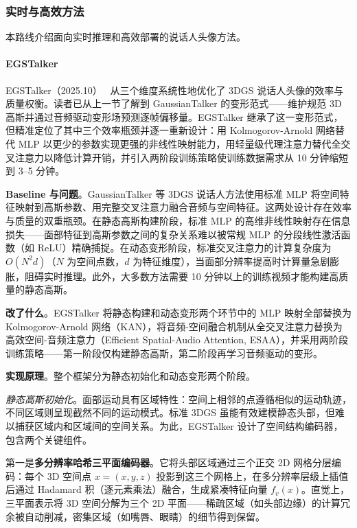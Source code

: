 \subsubsection{实时与高效方法}

本路线介绍面向实时推理和高效部署的说话人头像方法。

\paragraph{EGSTalker}

EGSTalker（2025.10）~\cite{2510_08587} 从三个维度系统性地优化了 3DGS 说话人头像的效率与质量权衡。读者已从上一节了解到 GaussianTalker 的变形范式——维护规范 3D 高斯并通过音频驱动变形场预测逐帧偏移量。EGSTalker 继承了这一变形范式，但精准定位了其中三个效率瓶颈并逐一重新设计：用 Kolmogorov-Arnold 网络替代 MLP 以更少的参数实现更强的非线性映射能力，用轻量级代理注意力替代全交叉注意力以降低计算开销，并引入两阶段训练策略使训练数据需求从 10 分钟缩短到 3--5 分钟。

\textbf{Baseline 与问题}。GaussianTalker 等 3DGS 说话人方法使用标准 MLP 将空间特征映射到高斯参数、用完整交叉注意力融合音频与空间特征。这两处设计存在效率与质量的双重瓶颈。在静态高斯构建阶段，标准 MLP 的高维非线性映射存在信息损失——面部特征到高斯参数之间的复杂关系难以被常规 MLP 的分段线性激活函数（如 ReLU）精确捕捉。在动态变形阶段，标准交叉注意力的计算复杂度为 $O(N^2 d)$（$N$ 为空间点数，$d$ 为特征维度），当面部分辨率提高时计算量急剧膨胀，阻碍实时推理。此外，大多数方法需要 10 分钟以上的训练视频才能构建高质量的静态高斯。

\textbf{改了什么}。EGSTalker 将静态构建和动态变形两个环节中的 MLP 映射全部替换为 Kolmogorov-Arnold 网络（KAN），将音频-空间融合机制从全交叉注意力替换为高效空间-音频注意力（Efficient Spatial-Audio Attention, ESAA），并采用两阶段训练策略——第一阶段仅构建静态高斯，第二阶段再学习音频驱动的变形。

\textbf{实现原理}。整个框架分为静态初始化和动态变形两个阶段。

\textit{静态高斯初始化}。面部运动具有区域特性：空间上相邻的点遵循相似的运动轨迹，不同区域则呈现截然不同的运动模式。标准 3DGS 虽能有效建模静态头部，但难以捕获区域内和区域间的空间关系。为此，EGSTalker 设计了空间结构编码器，包含两个关键组件。

第一是\textbf{多分辨率哈希三平面编码器}。它将头部区域通过三个正交 2D 网格分层编码：每个 3D 空间点 $x = (x, y, z)$ 投影到这三个网格上，在多分辨率层级上插值后通过 Hadamard 积（逐元素乘法）融合，生成紧凑特征向量 $f_v(x)$。直觉上，三平面表示将 3D 空间分解为三个 2D 平面——稀疏区域（如头部边缘）的计算冗余被自动削减，密集区域（如嘴唇、眼睛）的细节得到保留。

